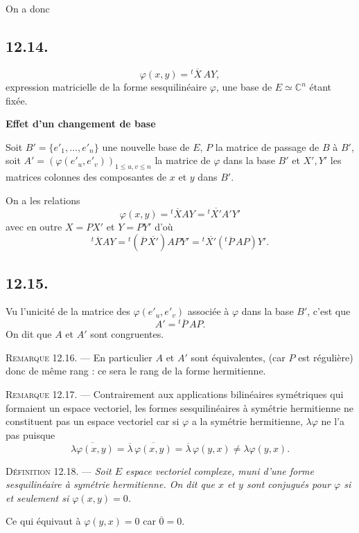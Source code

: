 On a donc

\subsection*{12.14.}
\[
\varphi(x,y)={}^t\!\overline X\,AY,
\]
expression matricielle de la forme sesquilinéaire $\varphi$, une base de $E\simeq\mathbb C^n$ étant fixée.

\medskip\noindent\textbf{Effet d'un changement de base}

Soit $B'=\{e'_1,\ldots,e'_n\}$ une nouvelle base de $E$, $P$ la matrice de passage de $B$ à $B'$, soit $A'=(\varphi(e'_u,e'_v))_{1\le u,v\le n}$ la matrice de $\varphi$ dans la base $B'$ et $X',Y'$ les matrices colonnes des composantes de $x$ et $y$ dans $B'$.

On a les relations
\[
\varphi(x,y)={}^t\!\overline X AY={}^t\!\overline{X'}A'Y'
\]
avec en outre $X=PX'$ et $Y=PY'$ d'où
\[
{}^t\!\overline X AY={}^t(\overline P\,\overline{X'})APY'
={}^t\!\overline{X'}({}^t\!\overline P\,AP)Y'.
\]

\subsection*{12.15.}
Vu l'unicité de la matrice des $\varphi(e'_u,e'_v)$ associée à $\varphi$ dans la base $B'$, c'est que
\[
A'={}^t\!\overline P\,AP.
\]
On dit que $A$ et $A'$ sont congruentes.

\medskip\noindent\textsc{Remarque 12.16.} --- En particulier $A$ et $A'$ sont équivalentes, (car $P$ est régulière) donc de même rang : ce sera le rang de la forme hermitienne.

\medskip\noindent\textsc{Remarque 12.17.} --- Contrairement aux applications bilinéaires symétriques qui formaient un espace vectoriel, les formes sesquilinéaires à symétrie hermitienne ne constituent pas un espace vectoriel car si $\varphi$ a la symétrie hermitienne, $\lambda\varphi$ ne l'a pas puisque
\[
\overline{\lambda\varphi(x,y)}=\overline\lambda\,\overline{\varphi(x,y)}=\overline\lambda\,\varphi(y,x)\ne\lambda\varphi(y,x).
\]


\medskip\noindent\textsc{Définition 12.18.} --- \emph{Soit $E$ espace vectoriel complexe, muni d'une forme sesquilinéaire à symétrie hermitienne. On dit que $x$ et $y$ sont conjugués pour $\varphi$ si et seulement si $\varphi(x,y)=0$.}

Ce qui équivaut à $\varphi(y,x)=0$ car $\overline0=0$.

